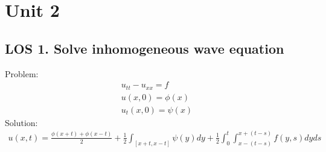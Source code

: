 \documentclass[12pt, a4paper]{article}
\begin{document}
\section*{Unit 2}
\vspace{1em}

\subsection*{LOS 1. Solve inhomogeneous wave equation}
Problem:
\begin{gather*}
    u_{tt} - u_{xx} = f \\
    u(x, 0) = \phi(x)\\
    u_t(x,0) = \psi(x)
\end{gather*}
Solution:
\begin{gather*}
    u(x, t) = \frac{\phi(x+t) + \phi(x-t)}{2} + \frac{1}{2} \int_{[x+t, x-t]}\psi(y)dy + \frac{1}{2} \int_0^t\int_{x-(t-s)}^{x+(t-s)}f(y, s)dyds
\end{gather*}
\vspace{0.3em}
\end{document}
